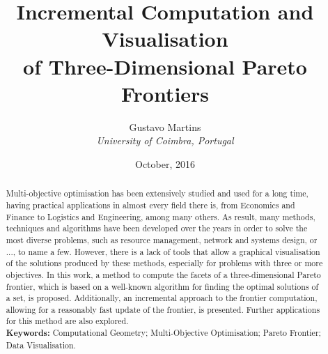 \documentclass[10pt, twoside]{article}
\title{\textbf{\huge Incremental Computation and Visualisation\\of Three-Dimensional Pareto Frontiers}}
\author{Gustavo Martins\\\normalsize \textit{University of Coimbra, Portugal}}
\date{October, 2016}
\begin{document}
	
\maketitle

\begin{abstract}
Multi-objective optimisation has been extensively studied and used for a long time, having practical applications in almost every field there is, from Economics and Finance to Logistics and Engineering, among many others. As result, many methods, techniques and algorithms have been developed over the years in order to solve the most diverse problems, such as resource management, network and systems design, or ..., to name a few. However, there is a lack of tools that allow a graphical visualisation of the solutions produced by these methods, especially for problems with three or more objectives. In this work, a method to compute the facets of a three-dimensional Pareto frontier, which is based on a well-known algorithm for finding the optimal solutions of a set, is proposed. Additionally, an incremental approach to the frontier computation, allowing for a reasonably fast update of the frontier, is presented. Further applications for this method are also explored.\\

\noindent\textbf{Keywords:} Computational Geometry; Multi-Objective Optimisation; Pareto Frontier; Data Visualisation.
\end{abstract}







\end{document}

